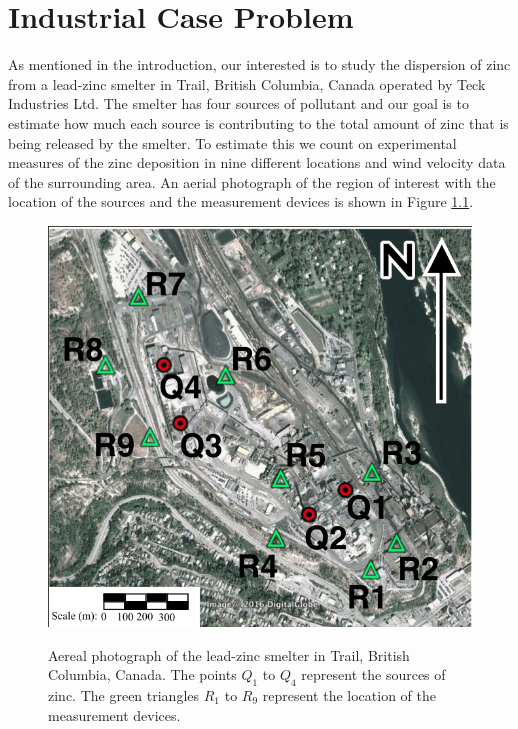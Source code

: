 \documentclass[12pt]{book}
\begin{document}



\chapter{Industrial Case Problem}



As mentioned in the introduction, our interested is to study
the dispersion of zinc from a lead-zinc smelter in Trail, British Columbia, Canada
operated by Teck Industries Ltd.  The smelter has four sources of pollutant and our goal
is to estimate how much  each source is contributing to the total amount of zinc
that is being released by the smelter.
To estimate this we count on experimental
measures of the zinc deposition in nine different locations and wind velocity data 
of the surrounding area. An aerial photograph of the region  of interest with 
the location of the sources and the measurement devices is shown 
in Figure \ref{figAereal}. 

 

\begin{figure}[H]
\centering
\includegraphics[scale=0.35]{FigChap4/AerealView}
\label{figAereal}
\caption{Aereal photograph of the lead-zinc smelter in Trail, British Columbia, Canada. The points
$Q_{1}$ to $Q_{4}$ represent the sources of zinc. The green triangles $R_{1}$ to $R_{9}$ represent
the location of the measurement devices.}
\end{figure}
\end{document}
